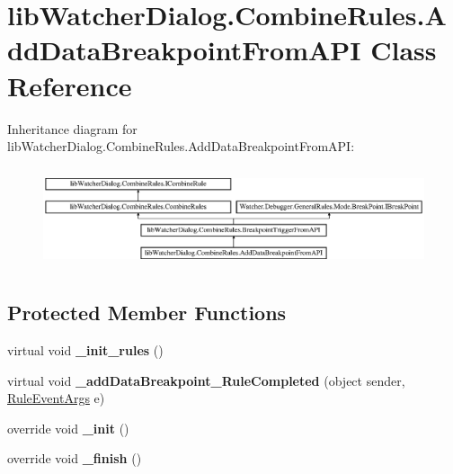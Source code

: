 \hypertarget{classlib_watcher_dialog_1_1_combine_rules_1_1_add_data_breakpoint_from_a_p_i}{\section{lib\+Watcher\+Dialog.\+Combine\+Rules.\+Add\+Data\+Breakpoint\+From\+A\+P\+I Class Reference}
\label{classlib_watcher_dialog_1_1_combine_rules_1_1_add_data_breakpoint_from_a_p_i}
}
Inheritance diagram for lib\+Watcher\+Dialog.\+Combine\+Rules.\+Add\+Data\+Breakpoint\+From\+A\+P\+I\+:\begin{figure}[H]
\begin{center}
\leavevmode
\includegraphics[height=2.978724cm]{classlib_watcher_dialog_1_1_combine_rules_1_1_add_data_breakpoint_from_a_p_i}
\end{center}
\end{figure}
\subsection*{Protected Member Functions}
\begin{DoxyCompactItemize}
\item 
\hypertarget{classlib_watcher_dialog_1_1_combine_rules_1_1_add_data_breakpoint_from_a_p_i_a4d682657662e8c4b4d03fa3391819e3e}{virtual void {\bfseries \+\_\+init\+\_\+rules} ()}\label{classlib_watcher_dialog_1_1_combine_rules_1_1_add_data_breakpoint_from_a_p_i_a4d682657662e8c4b4d03fa3391819e3e}

\item 
\hypertarget{classlib_watcher_dialog_1_1_combine_rules_1_1_add_data_breakpoint_from_a_p_i_aa7c2575ef595b3952cfd34c96f6fb261}{virtual void {\bfseries \+\_\+add\+Data\+Breakpoint\+\_\+\+Rule\+Completed} (object sender, \hyperlink{class_watcher_1_1_debugger_1_1_event_args_1_1_rule_event_args}{Rule\+Event\+Args} e)}\label{classlib_watcher_dialog_1_1_combine_rules_1_1_add_data_breakpoint_from_a_p_i_aa7c2575ef595b3952cfd34c96f6fb261}

\item 
\hypertarget{classlib_watcher_dialog_1_1_combine_rules_1_1_add_data_breakpoint_from_a_p_i_a0b0791f1f68e701bf37d0fa3ddadabfd}{override void {\bfseries \+\_\+init} ()}\label{classlib_watcher_dialog_1_1_combine_rules_1_1_add_data_breakpoint_from_a_p_i_a0b0791f1f68e701bf37d0fa3ddadabfd}

\item 
\hypertarget{classlib_watcher_dialog_1_1_combine_rules_1_1_add_data_breakpoint_from_a_p_i_a4e64e3e740be95166507dce5b0a80d8d}{override void {\bfseries \+\_\+finish} ()}\label{classlib_watcher_dialog_1_1_combine_rules_1_1_add_data_breakpoint_from_a_p_i_a4e64e3e740be95166507dce5b0a80d8d}

\end{DoxyCompactItemize}
